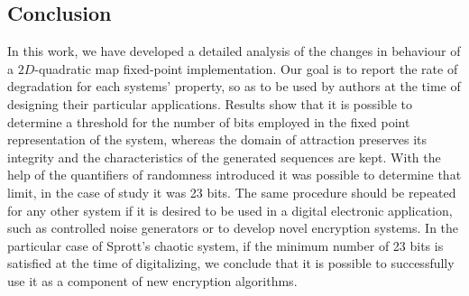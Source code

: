 \subsection{Conclusion} \label{sec:conclusions}
In this work, we have developed a detailed analysis of the changes in behaviour of a $2D$-quadratic map fixed-point implementation.
Our goal is to report the rate of degradation for each systems' property, so as to be used by authors at the time of designing their particular applications.
Results show that it is possible to determine a threshold for the number of bits employed in the fixed point representation of the system, whereas the domain of attraction preserves its integrity and the characteristics of the generated sequences are kept.
With the help of the quantifiers of randomness introduced it was possible to determine that limit, in the case of study it was 23 bits.
The same procedure should be repeated for any other system if it is desired to be used in a digital electronic application, such as controlled noise generators or to develop novel encryption systems.
In the particular case of Sprott's chaotic system, if the minimum number of 23 bits is satisfied at the time of digitalizing, we conclude that it is possible to successfully use it as a component of new encryption algorithms.